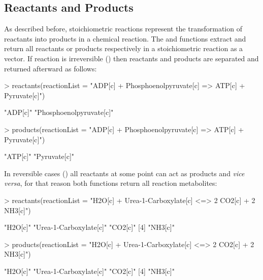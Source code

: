 \subsection{Reactants and Products}
As described before, stoichiometric reactions represent the transformation of reactants into products in a chemical reaction. The  and  functions extract and return all reactants or products respectively in a stoichiometric reaction as a vector. If reaction is irreversible () then reactants and products are separated and returned afterward as follows:
\begin{Schunk}
\begin{Sinput}
> reactants(reactionList = "ADP[c] + Phosphoenolpyruvate[c] => ATP[c] + Pyruvate[c]")
\end{Sinput}
\begin{Soutput}
[1] "ADP[c]"                 "Phosphoenolpyruvate[c]"
\end{Soutput}
\begin{Sinput}
> products(reactionList = "ADP[c] + Phosphoenolpyruvate[c] => ATP[c] + Pyruvate[c]")
\end{Sinput}
\begin{Soutput}
[1] "ATP[c]"      "Pyruvate[c]"
\end{Soutput}
\end{Schunk}
In reversible cases ()  all reactants at some point can act as products and \textit{vice versa}, for that reason both functions return all reaction metabolites:
\begin{Schunk}
\begin{Sinput}
> reactants(reactionList = "H2O[c] + Urea-1-Carboxylate[c] <=> 2 CO2[c] + 2 NH3[c]")
\end{Sinput}
\begin{Soutput}
[1] "H2O[c]"                "Urea-1-Carboxylate[c]" "CO2[c]"               
[4] "NH3[c]"               
\end{Soutput}
\begin{Sinput}
> products(reactionList = "H2O[c] + Urea-1-Carboxylate[c] <=> 2 CO2[c] + 2 NH3[c]")
\end{Sinput}
\begin{Soutput}
[1] "H2O[c]"                "Urea-1-Carboxylate[c]" "CO2[c]"               
[4] "NH3[c]"               
\end{Soutput}
\end{Schunk}

